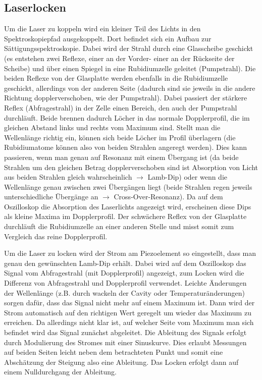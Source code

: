 \documentclass[12pt,a4paper]{article}
\begin{document}
  \subsection{Laserlocken}
    Um die Laser zu koppeln wird ein kleiner Teil des Lichts in den
    Spektroskopiepfad ausgekoppelt. Dort befindet sich ein Aufbau zur
    Sättigungsspektroskopie. Dabei wird der Strahl durch eine Glasscheibe geschickt
    (es entstehen zwei Reflexe, einer an der Vorder- einer an der Rückseite der
    Scheibe) und über einen Spiegel in eine Rubidiumzelle geleitet (Pumpstrahl). Die
    beiden Reflexe von der Glasplatte werden ebenfalls in die Rubidiumzelle geschickt,
    allerdings von der anderen Seite (dadurch sind sie jeweils in die andere Richtung
    dopplerverschoben, wie der Pumpstrahl). Dabei passiert der stärkere Reflex
    (Abfragestrahl) in der Zelle einen Bereich, den auch der Pumpstrahl durchläuft.
    Beide brennen dadurch Löcher in das normale Dopplerprofil, die im gleichen
    Abstand links und rechts vom Maximum sind. Stellt man die Wellenlänge richtig ein,
    können sich beide Löcher im Profil überlagern (die Rubidiumatome können also von
    beiden Strahlen angeregt werden). Dies kann passieren, wenn man genau auf
    Resonanz mit einem Übergang ist (da beide Strahlen um den gleichen Betrag
    dopplerverschoben sind ist Absorption von Licht aus beiden Strahlen gleich
    wahrscheinlich $\rightarrow$ Lamb-Dip) oder wenn die Wellenlänge genau zwischen
    zwei Übergängen liegt (beide Strahlen regen jeweils unterschiedliche Übergänge an
    $\rightarrow$ Cross-Over-Resonanz). Da auf dem Oszilloskop die Absorption des
    Laserlichts angezeigt wird, erscheinen diese Dips als kleine Maxima im
    Dopplerprofil. Der schwächere Reflex von der Glasplatte durchläuft die
    Rubidiumzelle an einer anderen Stelle und misst somit zum Vergleich das reine
    Dopplerprofil.
    
    Um die Laser zu locken wird der Strom am Piezoelement so eingestellt, dass man
    genau den gewünschten Lamb-Dip erhält. Dabei wird auf dem Oszilloskop das
    Signal vom Abfragestrahl (mit Dopplerprofil) angezeigt, zum Locken wird die
    Differenz von Abfragestrahl und Dopplerprofil verwendet. Leichte Änderungen der
    Wellenlänge (z.B. durch wackeln der Cavity oder Temperaturänderungen) sorgen
    dafür, dass das Signal nicht mehr auf einem Maximum ist. Dann wird der Strom
    automatisch auf den richtigen Wert geregelt um wieder das Maximum zu erreichen.
    Da allerdings nicht klar ist, auf welcher Seite vom Maximum man sich befindet
    wird das Signal zunächst abgeleitet. Die Ableitung des Signals erfolgt durch
    Modulierung des Stromes mit einer Sinuskurve. Dies erlaubt Messungen auf beiden
    Seiten leicht neben dem betrachteten Punkt und somit eine Abschätzung der Steigung
    also eine Ableitung. Das Locken erfolgt dann auf einem Nulldurchgang der Ableitung.
\end{document}
